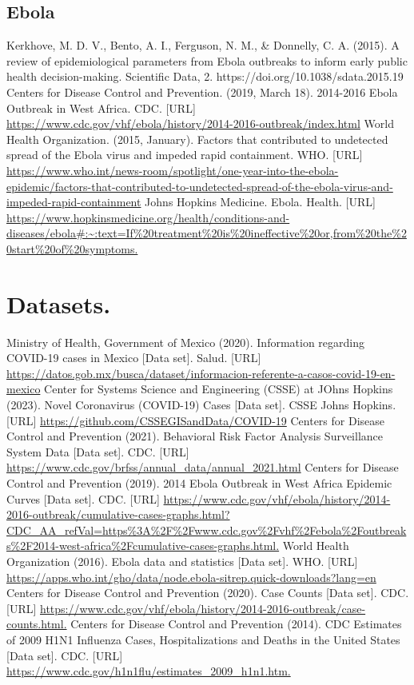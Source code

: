 \documentclass[11pt]{article}
\begin{document}
\begin{thebibliography}{100}
    \subsection*{Ebola}
     Kerkhove, M. D. V., Bento, A. I., Ferguson, N. M., \& Donnelly, C. A. (2015). A review of epidemiological parameters from Ebola outbreaks to inform early public health decision-making. Scientific Data, 2. https://doi.org/10.1038/sdata.2015.19
     Centers for Disease Control and Prevention. (2019, March 18). 2014-2016 Ebola Outbreak in West Africa. CDC. [URL] \url{https://www.cdc.gov/vhf/ebola/history/2014-2016-outbreak/index.html}
     World Health Organization. (2015, January). Factors that contributed to undetected spread of the Ebola virus and impeded rapid containment. WHO. [URL] \url{https://www.who.int/news-room/spotlight/one-year-into-the-ebola-epidemic/factors-that-contributed-to-undetected-spread-of-the-ebola-virus-and-impeded-rapid-containment}
     Johns Hopkins Medicine. Ebola. Health. [URL] \url{https://www.hopkinsmedicine.org/health/conditions-and-diseases/ebola#:~:text=If%20treatment%20is%20ineffective%20or,from%20the%20start%20of%20symptoms.}

    \section*{\textbf{Datasets.}}
     Ministry of Health, Government of Mexico (2020). 
    Information regarding COVID-19 cases in Mexico [Data set]. Salud. [URL] \url{https://datos.gob.mx/busca/dataset/informacion-referente-a-casos-covid-19-en-mexico}
     Center for Systems Science and Engineering (CSSE) at JOhns Hopkins (2023). 
    Novel Coronavirus (COVID-19) Cases [Data set]. CSSE Johns Hopkins. [URL] \url{https://github.com/CSSEGISandData/COVID-19}
     Centers for Disease Control and Prevention (2021). Behavioral Risk Factor Analysis Surveillance System Data [Data set]. CDC. [URL] \url{https://www.cdc.gov/brfss/annual_data/annual_2021.html}
     Centers for Disease Control and Prevention (2019). 2014 Ebola Outbreak in West Africa Epidemic Curves [Data set]. CDC. [URL] \url{https://www.cdc.gov/vhf/ebola/history/2014-2016-outbreak/cumulative-cases-graphs.html?CDC_AA_refVal=https%3A%2F%2Fwww.cdc.gov%2Fvhf%2Febola%2Foutbreaks%2F2014-west-africa%2Fcumulative-cases-graphs.html.}
     World Health Organization (2016). Ebola data and statistics  [Data set]. WHO. [URL] \url{https://apps.who.int/gho/data/node.ebola-sitrep.quick-downloads?lang=en}
     Centers for Disease Control and Prevention (2020). Case Counts [Data set]. CDC. [URL] \url{https://www.cdc.gov/vhf/ebola/history/2014-2016-outbreak/case-counts.html.}
     Centers for Disease Control and Prevention (2014). CDC Estimates of 2009 H1N1 Influenza Cases, Hospitalizations and Deaths in the United States [Data set]. CDC. [URL] \url{https://www.cdc.gov/h1n1flu/estimates_2009_h1n1.htm.}
    

\end{thebibliography}
\end{document}
